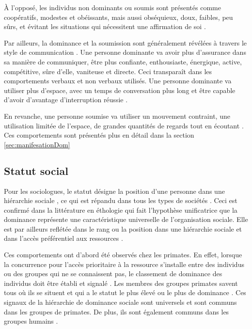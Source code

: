 		À l'opposé, les individus non dominants ou soumis sont présentés comme coopératifs, modestes et obéissants, mais aussi obséquieux, doux, faibles, peu sûrs, et évitant les situations qui nécessitent une affirmation de soi \cite{burgoon1998nature}. 
		
		
		Par ailleurs, la dominance et la soumission sont généralement révélées à travers le style de communication \cite{burgoon1998nature}. Une personne dominante va avoir plus d'assurance dans sa manière de communiquer, être plus confiante, enthousiaste, énergique, active, compétitive, sûre d'elle, vaniteuse et directe. Ceci transparaît dans les comportements verbaux et non verbaux utilisés. Une personne dominante va  utiliser plus d'espace, avec un temps de conversation plus long et être capable d'avoir d'avantage d'interruption réussie \cite{burgoon1998nature}. 
		
		En revanche, une personne soumise va utiliser un mouvement contraint, une utilisation limitée de l'espace, de grandes quantités de regards tout en écoutant  \cite{burgoon1998nature}. Ces comportements sont présentés plus en détail dans la section  \ref{sec:manifesationDom} 
		
	
	
	
	\subsection{Statut social}
	
		 Pour les sociologues, le statut désigne la position d'une personne dans une hiérarchie sociale \cite{ellyson1985power}, ce qui est répandu dans tous les types de sociétés \cite{lips1991women}.
		Ceci est confirmé  dans la littérature en éthologie qui fait l'hypothèse unificatrice que la dominance représente une caractéristique universelle de l'organisation sociale. Elle est par ailleurs reflétée dans le rang ou la position dans une hiérarchie sociale \cite{burgoon1998nature} et dans l'accès préférentiel aux ressources \cite{liska1990dominance}.
		
		Ces comportements ont d'abord été observés chez les primates. En effet, lorsque la concurrence pour l'accès prioritaire à la ressource s'installe entre des individus ou des groupes qui ne se connaissent pas, le classement de dominance des individus doit être établi et signalé \cite{burgoon1998nature}. Les membres des groupes primates savent tous où ils se situent et qui a le statut le plus élevé ou le plus de dominance \cite{smither1993authoritarianism}.
		Ces signaux de la hiérarchie de dominance sociale sont universels et sont communs dans les groupes de primates. De plus, ils sont également communs dans les groupes humains \cite{burgoon1998nature}.
		

